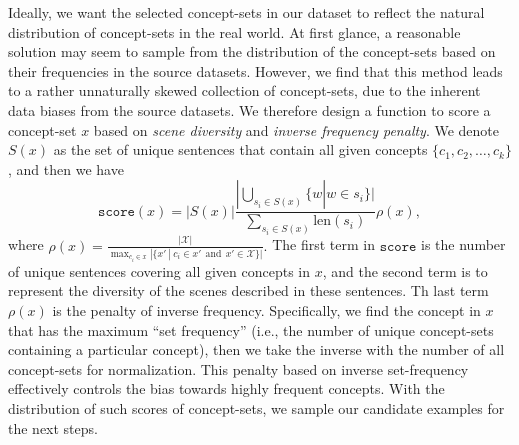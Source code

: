 \documentclass[11pt,a4paper]{article}
\begin{document}
Ideally, we want the selected concept-sets in our dataset to reflect the natural distribution of concept-sets in the real world. 
At first glance, a reasonable solution may seem to sample from the distribution of the concept-sets based on their frequencies in the source datasets. 
However, we find that this method leads to a rather unnaturally skewed collection of concept-sets, due to the inherent data biases from the source datasets.   
We therefore design a function to score a concept-set $x$ based on  \textit{scene diversity} and  \textit{inverse frequency penalty}.
	We denote $S(x)$ as the set of unique sentences that contain all given concepts $\{c_1, c_2, \dots, c_k\}$, and then we have  
	{{$$ \texttt{score}(x) =|S(x)|   \frac{|\bigcup_{s_i \in S(x)}\{w | w \in s_i\}|}{\sum_{s_i \in S(x)} \text{len}(s_i)} \rho(x),$$}}where $\rho(x) = \frac{|\mathcal{X}|}{\max_{c_i\in x}|\{x' ~|~ c_i \in x' ~~\text{and}~~ x' \in \mathcal{X}\}|}.$
	The first term in $\texttt{score}$ is the number of unique sentences covering all given concepts in $x$, and
	the second term is to represent the diversity of the scenes described in these sentences.
	Th last term $\rho(x)$ is the penalty of inverse frequency.
	Specifically, we find the concept in $x$ that has the maximum ``set frequency'' (i.e., the number of unique concept-sets containing a particular concept), then we take the inverse with the number of all concept-sets for normalization. 
	This penalty based on inverse set-frequency effectively controls the bias towards highly frequent concepts.
	With the distribution of such scores of concept-sets, we sample our candidate examples for the next steps.
\end{document}
